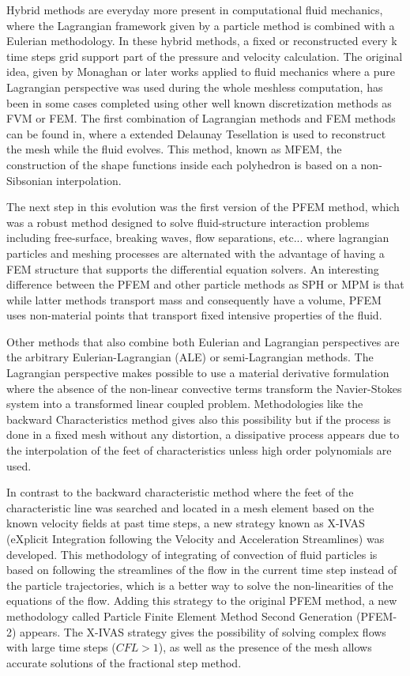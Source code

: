 
Hybrid methods are everyday more present in computational fluid mechanics, where the Lagrangian framework given by a particle method is combined with a Eulerian methodology. In these hybrid methods, a fixed or reconstructed every k time steps grid support part of the pressure and velocity calculation. The original idea, given by Monaghan \cite{Mon77} or later works applied to fluid mechanics \cite{Monaghan88} where a pure Lagrangian perspective was used during the whole meshless computation, has been in some cases completed using other well known discretization methods as FVM\cite{Nestor20091733} or FEM\cite{Ide03}. The first combination of Lagrangian methods and FEM methods can be found in\cite{Ide03b}, where a extended Delaunay Tesellation is used to reconstruct the mesh while the fluid evolves. This method, known as MFEM, the construction of the shape functions inside each polyhedron is based on a non-Sibsonian interpolation.

The next step in this evolution was the first version of the PFEM method\cite{Idelsohn04}, which was a robust method designed to solve fluid-structure interaction problems including free-surface, breaking waves, flow separations, etc... where lagrangian particles and meshing processes are alternated with the advantage of having a FEM structure that supports the differential equation solvers. An interesting difference between the PFEM and other particle methods as SPH or MPM\cite{Wieckowsky04} is that while latter methods transport mass and consequently have a volume, PFEM uses non-material points that transport fixed intensive properties of the fluid.

Other methods that also combine both Eulerian and Lagrangian perspectives are the arbitrary Eulerian-Lagrangian (ALE)\cite{Donea83} or semi-Lagrangian methods\cite{Bermejo}. The Lagrangian perspective makes possible to use a material derivative formulation where the absence of the non-linear convective terms transform the Navier-Stokes system into a transformed linear coupled problem. Methodologies like the backward Characteristics method\cite{Bermejo} gives also this possibility but if the process is done in a fixed mesh without any distortion, a dissipative process appears due to the interpolation of the feet of characteristics unless high order polynomials are used.

In contrast to the backward characteristic method where the feet of the characteristic line was searched and located in a mesh element based on the known velocity fields at past time steps, a new strategy known as X-IVAS (eXplicit Integration following the Velocity and Acceleration Streamlines) was developed\cite{Idelsohn12}. This methodology of integrating of convection of fluid particles is based on following the streamlines of the flow in the current time step instead of the particle trajectories, which is a better way to solve the non-linearities of the equations of the flow. Adding this strategy to the original PFEM method, a new methodology called Particle Finite Element Method Second Generation (PFEM-2)\cite{Idelsohn12b} appears. The X-IVAS strategy gives the possibility of solving complex flows with large time steps ($CFL>1$), as well as the presence of the mesh allows accurate solutions of the fractional step method.

